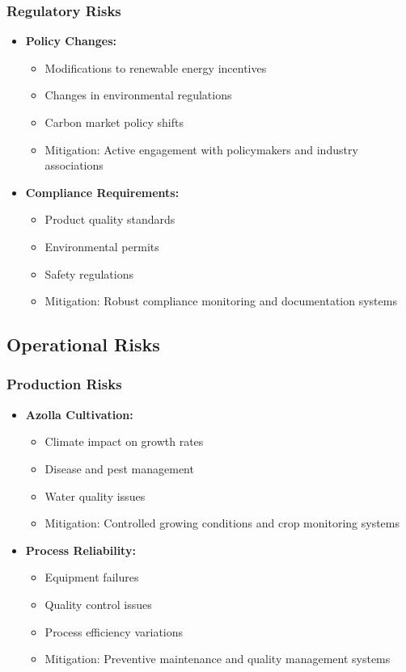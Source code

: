 \subsubsection{Regulatory Risks}
\begin{itemize}
    \item \textbf{Policy Changes:}
    \begin{itemize}
        \item Modifications to renewable energy incentives
        \item Changes in environmental regulations
        \item Carbon market policy shifts
        \item Mitigation: Active engagement with policymakers and industry associations
    \end{itemize}
    
    \item \textbf{Compliance Requirements:}
    \begin{itemize}
        \item Product quality standards
        \item Environmental permits
        \item Safety regulations
        \item Mitigation: Robust compliance monitoring and documentation systems
    \end{itemize}
\end{itemize}

\subsection{Operational Risks}

\subsubsection{Production Risks}
\begin{itemize}
    \item \textbf{Azolla Cultivation:}
    \begin{itemize}
        \item Climate impact on growth rates
        \item Disease and pest management
        \item Water quality issues
        \item Mitigation: Controlled growing conditions and crop monitoring systems
    \end{itemize}
    
    \item \textbf{Process Reliability:}
    \begin{itemize}
        \item Equipment failures
        \item Quality control issues
        \item Process efficiency variations
        \item Mitigation: Preventive maintenance and quality management systems
    \end{itemize}
\end{itemize}

